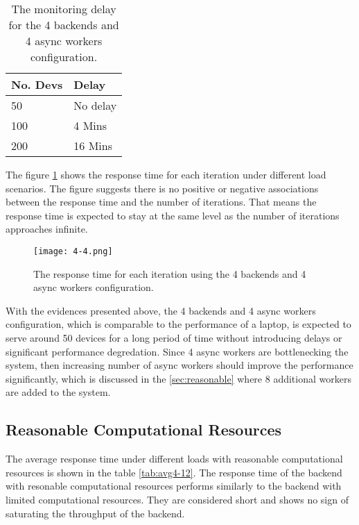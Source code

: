 \documentclass[../thesis.tex]{subfiles}
\begin{document}
\begin{table}[h!]
	\begin{center}
		\caption{The monitoring delay for the 4 backends and 4 async workers configuration.}
		\label{tab:delay4-4}
		\begin{tabular}{l|l}
			\toprule
			\textbf{No. Devs} & \textbf{Delay}\\
			\midrule
			50 & No delay \\
			100 & 4 Mins\\
			200 & 16 Mins\\
			\bottomrule
		\end{tabular}
	\end{center}
\end{table}

The figure \ref{fig:4-4} shows the response time for each iteration under different load scenarios. The figure suggests there is no positive or negative associations between the response time and the number of iterations. That means the response time is expected to stay at the same level as the number of iterations approaches infinite. 

\begin{figure}[!ht]
	\centering
	\texttt{[image: 4-4.png]}
	\caption{The response time for each iteration using the 4 backends and 4 async workers configuration.}
	\label{fig:4-4}
\end{figure}

With the evidences presented above, the 4 backends and 4 async workers configuration, which is comparable to the performance of a laptop, is expected to serve around 50 devices for a long period of time without introducing delays or significant performance degredation. Since 4 async workers are bottlenecking the system, then increasing number of async workers should improve the performance significantly, which is discussed in the \autoref{sec:reasonable} where 8 additional workers are added to the system. 

\subsection{Reasonable Computational Resources}
\label{sec:reasonable}
The average response time under different loads with reasonable computational resources is shown in the table \ref{tab:avg4-12}. The response time of the backend with resonable computational resources performs similarly to the backend with limited computational resources. They are considered short and shows no sign of saturating the throughput of the backend. 
\end{document}
